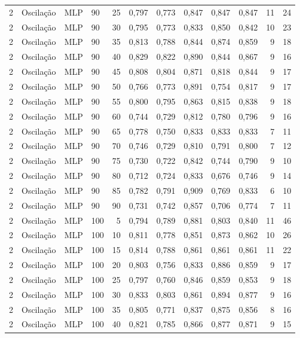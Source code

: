\begin{longtable}{ccclrrrrrrrr}
2 & Oscilação & MLP & 90 & 25 & 0,797 & 0,773 & 0,847 & 0,847 & 0,847 & 11 & 24 \\
2 & Oscilação & MLP & 90 & 30 & 0,795 & 0,773 & 0,833 & 0,850 & 0,842 & 10 & 23 \\
2 & Oscilação & MLP & 90 & 35 & 0,813 & 0,788 & 0,844 & 0,874 & 0,859 & 9 & 18 \\
2 & Oscilação & MLP & 90 & 40 & 0,829 & 0,822 & 0,890 & 0,844 & 0,867 & 9 & 16 \\
2 & Oscilação & MLP & 90 & 45 & 0,808 & 0,804 & 0,871 & 0,818 & 0,844 & 9 & 17 \\
2 & Oscilação & MLP & 90 & 50 & 0,766 & 0,773 & 0,891 & 0,754 & 0,817 & 9 & 17 \\
2 & Oscilação & MLP & 90 & 55 & 0,800 & 0,795 & 0,863 & 0,815 & 0,838 & 9 & 18 \\
2 & Oscilação & MLP & 90 & 60 & 0,744 & 0,729 & 0,812 & 0,780 & 0,796 & 9 & 16 \\
2 & Oscilação & MLP & 90 & 65 & 0,778 & 0,750 & 0,833 & 0,833 & 0,833 & 7 & 11 \\
2 & Oscilação & MLP & 90 & 70 & 0,746 & 0,729 & 0,810 & 0,791 & 0,800 & 7 & 12 \\
2 & Oscilação & MLP & 90 & 75 & 0,730 & 0,722 & 0,842 & 0,744 & 0,790 & 9 & 10 \\
2 & Oscilação & MLP & 90 & 80 & 0,712 & 0,724 & 0,833 & 0,676 & 0,746 & 9 & 14 \\
2 & Oscilação & MLP & 90 & 85 & 0,782 & 0,791 & 0,909 & 0,769 & 0,833 & 6 & 10 \\
2 & Oscilação & MLP & 90 & 90 & 0,731 & 0,742 & 0,857 & 0,706 & 0,774 & 7 & 11 \\
2 & Oscilação & MLP & 100 & 5 & 0,794 & 0,789 & 0,881 & 0,803 & 0,840 & 11 & 46 \\
2 & Oscilação & MLP & 100 & 10 & 0,811 & 0,778 & 0,851 & 0,873 & 0,862 & 10 & 26 \\
2 & Oscilação & MLP & 100 & 15 & 0,814 & 0,788 & 0,861 & 0,861 & 0,861 & 11 & 22 \\
2 & Oscilação & MLP & 100 & 20 & 0,803 & 0,756 & 0,833 & 0,886 & 0,859 & 9 & 17 \\
2 & Oscilação & MLP & 100 & 25 & 0,797 & 0,760 & 0,846 & 0,859 & 0,853 & 9 & 18 \\
2 & Oscilação & MLP & 100 & 30 & 0,833 & 0,803 & 0,861 & 0,894 & 0,877 & 9 & 16 \\
2 & Oscilação & MLP & 100 & 35 & 0,805 & 0,771 & 0,837 & 0,875 & 0,856 & 8 & 16 \\
2 & Oscilação & MLP & 100 & 40 & 0,821 & 0,785 & 0,866 & 0,877 & 0,871 & 9 & 15 \\

\end{longtable}
